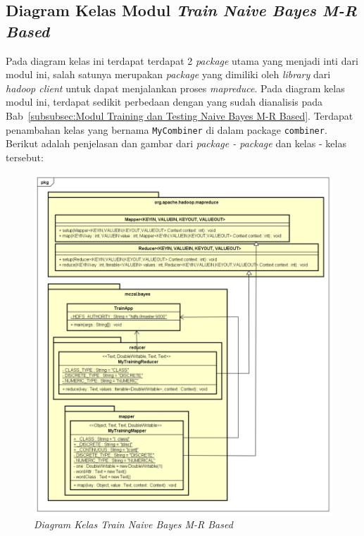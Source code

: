 \subsection{Diagram Kelas Modul \textit{Train Naive Bayes M-R Based}}
Pada diagram kelas ini terdapat terdapat 2 \textit{package} utama yang menjadi inti dari modul ini, salah satunya merupakan \textit{package} yang dimiliki oleh \textit{library} dari \textit{hadoop client} untuk dapat menjalankan proses \textit{mapreduce}. Pada diagram kelas modul ini, terdapat sedikit perbedaan dengan yang sudah dianalisis pada Bab~\ref{subsubsec:Modul Training dan Testing Naive Bayes M-R Based}. Terdapat penambahan kelas yang bernama \texttt{MyCombiner} di dalam package \texttt{combiner}. Berikut adalah penjelasan dan gambar dari \textit{package - package} dan kelas - kelas tersebut:
\begin{figure}[H]
	\centering
	\includegraphics[scale=0.6]{ClassDiagramLengkap/CD_Train_MR}
	\caption[Diagram Kelas \textit{Train Naive Bayes M-R Based}]{\textit{Diagram Kelas Train Naive Bayes M-R Based}}
	\label{fig:Diagram Kelas Modul Kelola Input}
\end{figure}

